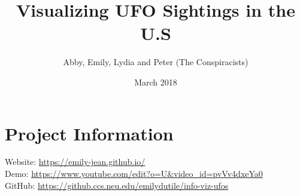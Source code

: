 \documentclass{neu_handout}
\title{Visualizing UFO Sightings in the U.S}
\author{Abby, Emily, Lydia and Peter (The Conspiracists)}
\date{March 2018}
\begin{document}
\section*{Project Information}

Website:  \url{https://emily-jean.github.io/ } \\

Demo:  \url{https://www.youtube.com/edit?o=U&video_id=pvVv4dxeYa0 } \\

GitHub: \url{https://github.ccs.neu.edu/emilydutile/info-viz-ufos} \\
 
\end{document}
